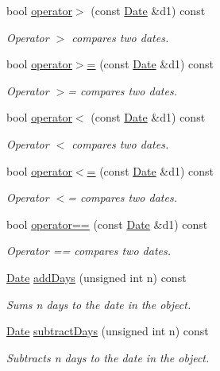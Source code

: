 \begin{DoxyCompactItemize}
bool \hyperlink{class_date_aa4c0f619e51dca5ef53284e548d4d0af}{operator$>$} (const \hyperlink{class_date}{Date} \&d1) const
\begin{DoxyCompactList}\small\item\em Operator $>$ compares two dates. \end{DoxyCompactList}\item 
bool \hyperlink{class_date_ae5a781b0f45775eece17d7f3dd5b3703}{operator$>$=} (const \hyperlink{class_date}{Date} \&d1) const
\begin{DoxyCompactList}\small\item\em Operator $>$= compares two dates. \end{DoxyCompactList}\item 
bool \hyperlink{class_date_a352ad2bec798ce5802231d49bf0a16e8}{operator$<$} (const \hyperlink{class_date}{Date} \&d1) const
\begin{DoxyCompactList}\small\item\em Operator $<$ compares two dates. \end{DoxyCompactList}\item 
bool \hyperlink{class_date_a50265b854c407eb0f3247b41f5cd1258}{operator$<$=} (const \hyperlink{class_date}{Date} \&d1) const
\begin{DoxyCompactList}\small\item\em Operator $<$= compares two dates. \end{DoxyCompactList}\item 
bool \hyperlink{class_date_ac906e253d7d1343e3e161fb9e1aee707}{operator==} (const \hyperlink{class_date}{Date} \&d1) const
\begin{DoxyCompactList}\small\item\em Operator == compares two dates. \end{DoxyCompactList}\item 
\hyperlink{class_date}{Date} \hyperlink{class_date_a48e19b5b03c19466bfe245d5ae2b979a}{add\+Days} (unsigned int n) const
\begin{DoxyCompactList}\small\item\em Sums n days to the date in the object. \end{DoxyCompactList}\item 
\hyperlink{class_date}{Date} \hyperlink{class_date_a16e8cb570b74e2d7a7050b53c0767542}{subtract\+Days} (unsigned int n) const
\begin{DoxyCompactList}\small\item\em Subtracts n days to the date in the object. \end{DoxyCompactList}\item 

\end{DoxyCompactItemize}
